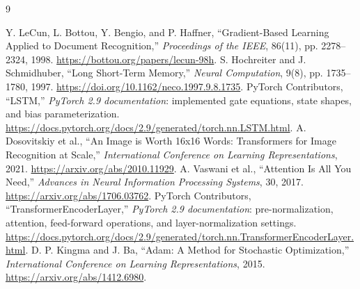 \begin{thebibliography}{9}\small\raggedright
{} Y. LeCun, L. Bottou, Y. Bengio, and P. Haffner,
``Gradient-Based Learning Applied to Document Recognition,''
\emph{Proceedings of the IEEE}, 86(11), pp. 2278--2324, 1998.
\url{https://bottou.org/papers/lecun-98h}.
 S. Hochreiter and J. Schmidhuber,
``Long Short-Term Memory,'' \emph{Neural Computation}, 9(8),
pp. 1735--1780, 1997. \url{https://doi.org/10.1162/neco.1997.9.8.1735}.
 PyTorch Contributors,
``LSTM,'' \emph{PyTorch 2.9 documentation}: implemented gate equations,
state shapes, and bias parameterization.
\url{https://docs.pytorch.org/docs/2.9/generated/torch.nn.LSTM.html}.
 A. Dosovitskiy et al.,
``An Image is Worth 16x16 Words: Transformers for Image Recognition at Scale,''
\emph{International Conference on Learning Representations}, 2021.
\url{https://arxiv.org/abs/2010.11929}.
 A. Vaswani et al., ``Attention Is All You Need,''
\emph{Advances in Neural Information Processing Systems}, 30, 2017.
\url{https://arxiv.org/abs/1706.03762}.
 PyTorch Contributors,
``TransformerEncoderLayer,'' \emph{PyTorch 2.9 documentation}: pre-normalization,
attention, feed-forward operations, and layer-normalization settings.
\url{https://docs.pytorch.org/docs/2.9/generated/torch.nn.TransformerEncoderLayer.html}.
 D. P. Kingma and J. Ba,
``Adam: A Method for Stochastic Optimization,''
\emph{International Conference on Learning Representations}, 2015.
\url{https://arxiv.org/abs/1412.6980}.
\end{thebibliography}
